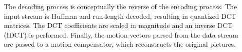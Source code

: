 The decoding process is conceptually the reverse of the encoding
process. The input stream is Huffman and run-length decoded, resulting
in quantized DCT matrices. The DCT coefficients are scaled in
magnitude and an inverse DCT (IDCT) is performed.
Finally, the motion vectors parsed from the data stream are passed to
a motion compensator, which reconstructs the original pictures. 
